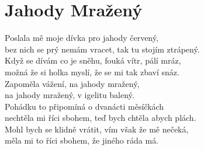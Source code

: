 \section{Jahody Mražený}

\onehalfspacing

Poslala mě moje dívka pro jahody červený,\\
bez nich se prý nemám vracet, tak tu stojím ztrápený.\\
Když se dívám co je sněhu, fouká vítr, pálí mráz,\\
možná že si holka myslí, že se mi tak zbaví snáz.\\

{}Zapoměla vážení, na jahody mražený,\\
na jahody mražený, v igelitu balený. \\

Pohádku to připomíná o dvanácti měsíčkách\\
nechtěla mi říci sbohem, teď bych chtěla abych plách.\\
Mohl bych se klidně vrátit, vím však že mě nečeká,\\
měla mi to říci sbohem, že jiného ráda má. \\
